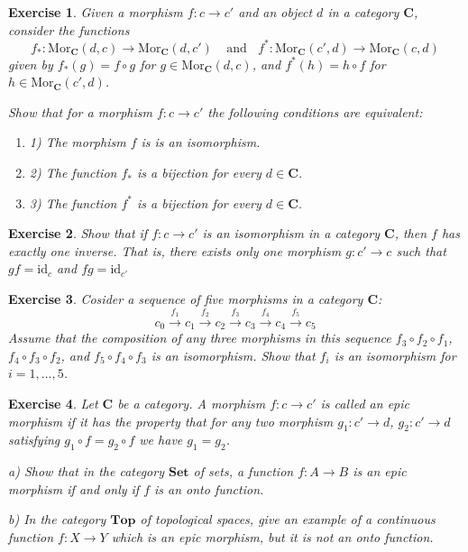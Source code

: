 \documentclass[11pt, letterpaper, oneside]{report}
\theoremstyle{pplain}
\theoremstyle{ddefinition}
\theoremstyle{nnn}
\theoremstyle{eexercise}
\newtheorem{exercise}{Exercise}[chapter]
\newcommand{\Mor}{\mathrm{Mor}}
\newcommand{\id}{\mathrm{id}}
\newcommand{\CC}{{\mathbf C}}
\newcommand{\Top}{{\mathbf{Top}}}
\newcommand{\Set}{{\mathbf{Set}}}
\newcommand{\benu}{\begin{enumerate}}
\newcommand{\eenu}{\end{enumerate}}
\begin{document}
\begin{exercise}
Given  a morphism  $f\colon c \to c'$ and an object $d$ in a category $\CC$, consider the functions 
$$f_{\ast}\colon \Mor_{\CC}(d, c) \to \Mor_{\CC}(d, c') \ \ \ \ \ \text{and}  \ \ \ \ 
f^{\ast}\colon \Mor_{\CC}(c', d) \to \Mor_{\CC}(c, d)$$
given by $f_{\ast}(g) = f\circ g$  for $g \in  \Mor_{\CC}(d, c)$, 
and $f^{\ast}(h) = h\circ f$ for $h \in  \Mor_{\CC}(c', d)$. 

Show that  for a  morphism $f\colon c \to c'$  the following conditions are equivalent:
\benu
\item[1)] The morphism $f$ is is an isomorphism.
\item[2)] The function $f_{\ast}$ is a bijection for every $d\in \CC$.
\item[3)] The function $f^{\ast}$ is a bijection for every $d\in \CC$. 
\eenu
\end{exercise}


\begin{exercise}
Show that if $f\colon c \to c'$ is an isomorphism in a category $\CC$, then $f$ has exactly
one inverse. That is, there exists only one morphism $g\colon c' \to c$ such that 
$gf= \id_{c}$ and $fg = \id_{c'}$
\end{exercise}



\begin{exercise}
Cosider a sequence of five morphisms in a category $\CC$:
$$
c_{0} \xrightarrow{f_{1}} 
c_{1} \xrightarrow{f_{2}} 
c_{2} \xrightarrow{f_{3}} 
c_{3} \xrightarrow{f_{4}} 
c_{4} \xrightarrow{f_{5}} 
c_{5}
$$
Assume that the composition of any three morphisms in this sequence $f_{3}\circ f_{2}\circ f_{1}$, 
$f_{4}\circ f_{3}\circ f_{2}$, and $f_{5}\circ f_{4}\circ f_{3}$ is an isomorphism. Show that 
$f_{i}$ is an isomorphism for $i=1,\dots, 5$.
\end{exercise}


\begin{exercise}
Let $\CC$ be a category. A morphism $f\colon c\to c'$ is called an \emph{epic} morphism
if it has the property that for any two morphism $g_{1}\colon c' \to d$,  $g_{2}\colon c' \to d$
satisfying $g_{1}\circ f = g_{2}\circ f$ we have $g_{1} = g_{2}$. 

a) Show that in the category $\Set$ of sets, a function $f\colon A\to B$ is an epic morphism
if and only if $f$ is an onto function.

b) In the category $\Top$ of topological spaces, give an example of a continuous 
function $f\colon X \to Y$ which is an epic morphism, but it is not an onto function.
\end{exercise}
\end{document}
